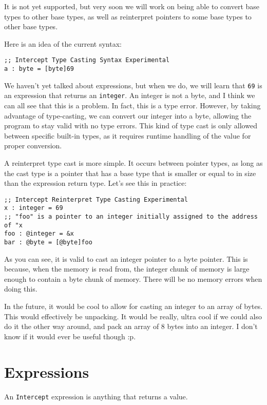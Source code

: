 \documentclass[12pt]{report}
\begin{document}
It is not yet supported, but very soon we will work on being able to convert base types to other base types, as well as reinterpret pointers to some base types to other base types.

Here is an idea of the current syntax:
\begin{Verbatim}[samepage=true]
;; Intercept Type Casting Syntax Experimental
a : byte = [byte]69
\end{Verbatim}

We haven't yet talked about expressions, but when we do, we will learn that \verb|69| is an expression that returns an \verb|integer|. An integer is not a byte, and I think we can all see that this is a problem. In fact, this is a type error. However, by taking advantage of type-casting, we can convert our integer into a byte, allowing the program to stay valid with no type errors. This kind of type cast is only allowed between specific built-in types, as it requires runtime handling of the value for proper conversion.

A reinterpret type cast is more simple. It occurs between pointer types, as long as the cast type is a pointer that has a base type that is smaller or equal to in size than the expression return type. Let's see this in practice:
\begin{Verbatim}[samepage=true]
;; Intercept Reinterpret Type Casting Experimental
x : integer = 69
;; "foo" is a pointer to an integer initially assigned to the address of "x
foo : @integer = &x
bar : @byte = [@byte]foo
\end{Verbatim}

As you can see, it is valid to cast an integer pointer to a byte pointer. This is because, when the memory is read from, the integer chunk of memory is large enough to contain a byte chunk of memory. There will be no memory errors when doing this.

In the future, it would be cool to allow for casting an integer to an array of bytes. This would effectively be unpacking. It would be really, ultra cool if we could also do it the other way around, and pack an array of 8 bytes into an integer. I don't know if it would ever be useful though :p.

\chapter{Expressions}
\label{sec:expressions}

An \verb|Intercept| expression is anything that returns a value.
\end{document}
